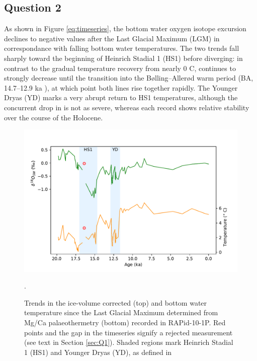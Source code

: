\subsection{Question 2}
As shown in Figure \ref{eq:timeseries}, the bottom water oxygen isotope excursion  declines to negative values after the Last Glacial Maximum (LGM) in correspondance with falling bottom water temperatures.
The two trends fall sharply toward the beginning of Heinrich Stadial 1 (HS1) before diverging: in contrast to the gradual temperature recovery from nearly 0 \degree{}C,  continues to strongly decrease until the transition into the Bølling–Allerød warm period (BA, 14.7–12.9 ka \parencite{thornalley2011reconstructing}), at which point both lines rise together rapidly.
The Younger Dryas (YD) marks a very abrupt return to HS1 temperatures, although the concurrent drop in  is not as severe, whereas each record shows relative stability over the course of the Holocene.


\begin{figure} \label{eq:timeseries}
\includegraphics[width=\textwidth]{img/timeseries_temp_and_d18Osw.pdf}
    \caption{Trends in the ice-volume corrected  (top) and bottom water temperature since the Last Glacial Maximum determined from Mg/Ca palaeothermetry (bottom) recorded in RAPid-10-1P.
             Red points and the gap in the timeseries signify a rejected measurement (see text in Section \ref{sec:Q1}).
             Shaded regions mark Heinrich Stadial 1 (HS1) and Younger Dryas (YD), as defined in \citeauthor{thornalley2011reconstructing} \parencite{thornalley2011reconstructing}}.
        \label{fig:timeseriestempd18Osw}
\end{figure}
